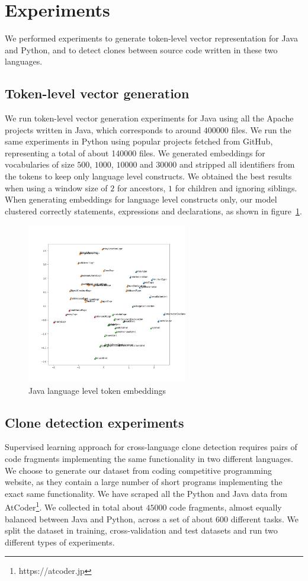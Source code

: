 \documentclass[11pt,a4paper,twocolumn]{article}
\begin{document}
\section{Experiments}
We performed experiments to generate token-level vector representation for Java
and Python, and to detect clones between source code written in these two
languages.
\subsection{\label{ssec:embedding-generation-experiment}Token-level vector generation}
We run token-level vector generation experiments for Java using all the Apache
projects written in Java, which corresponds to around $400000$ files. We run the
same experiments in Python using popular projects fetched from GitHub,
representing a total of about 140000 files.
We generated embeddings for vocabularies of size $500$, $1000$, $10000$ and
$30000$ and stripped all identifiers from the tokens to keep only language level
constructs.
We obtained the best results when using a window size of $2$ for ancestors, $1$
for children and ignoring siblings.
When generating embeddings for language level constructs only, our model
clustered correctly statements, expressions and declarations, as shown
in figure~\ref{fig:token-embeddings}.
\begin{figure}
  \centering\includegraphics[width=7cm]{../thesis/images/java-embeddings.png}
  \vskip -10mm
  \caption{\label{fig:token-embeddings}Java language level token embeddings}
\end{figure}
\subsection{Clone detection experiments}
Supervised learning approach for cross-language clone detection requires pairs
of code fragments implementing
the same functionality in two different languages.
We choose to generate our dataset from coding competitive programming website,
as they contain a large number of short programs implementing the exact same
functionality. We have scraped all the Python and Java data
from AtCoder\footnote{https://atcoder.jp}. We collected in total about $45000$
code fragments, almost equally balanced between Java and Python, across a set of
about 600 different tasks. We split the dataset in training, cross-validation
and test datasets and run two different types of experiments.
\end{document}
